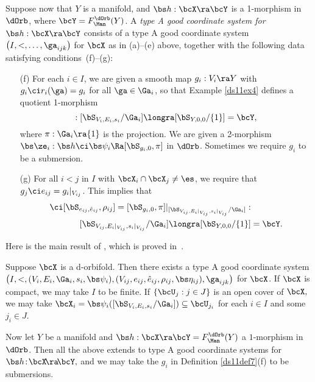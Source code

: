 \documentclass{article}
\begin{document}
\begin{dfn}
Suppose now that $Y$ is a manifold, and $\bs h:\bcX\ra\bcY$ is a
1-morphism in $\dOrb$, where $\bcY=F_\Man^\dOrb(Y)$. A {\it type A
good coordinate system for\/} $\bs h:\bcX\ra\bcY$ consists of a type
A good coordinate system $\bigl(I,<,\ldots,\ga_{ijk}\bigr)$ for
$\bcX$ as in (a)--(e) above, together with the following data
satisfying conditions~(f)--(g):
\begin{itemize}
\setlength{\itemsep}{0pt}
\setlength{\parsep}{0pt}
\item[(f)] For each $i\in I$, we are given a smooth map
$g_i:V_i\ra Y$ with $g_i\ci r_i(\ga)= g_i$ for all
$\ga\in\Ga_i$, so that Example \ref{ds11ex4} defines a quotient
1-morphism
\begin{equation*}
[\bS_{g_i,0},\pi]:[\bS_{V_i, E_i,s_i}/\Ga_i] \longra
[\bS_{Y,0,0}/\{1\}]=\bcY,
\end{equation*}
where $\pi:\Ga_i\ra\{1\}$ is the projection. We are given a
2-morphism $\bs\ze_i:\bs h\ci\bs\psi_i\Ra[\bS_{g_i,0},\pi]$ in
$\dOrb$. Sometimes we require $g_i$ to be a submersion.
\item[(g)] For all $i<j$ in $I$ with $\bcX_i\cap\bcX_j \ne\es$,
we require that $g_j\ci e_{ij}= g_i\vert_{V_{ij}}$. This implies
that
\begin{align*}
[\bS_{g_j,0},\pi]\ci [\bS_{\smash{e_{ij},\hat
e_{ij}}},\rho_{ij}]=[\bS_{g_i,0},\pi]\vert_{[\bS_{V_{ij},
E_i\vert_{V_{ij}},s_i\vert_{V_{ij}}}/\Ga_i]}:&\\
[\bS_{V_{ij},E_i\vert_{V_{ij}},s_i \vert_{V_{ij}}}/\Ga_i]
\longra [\bS_{Y,0,0}/\{1\}]&=\bcY.
\end{align*}
\end{itemize}
\label{ds11def7}
\end{dfn}

Here is the main result of \cite[\S 10.8]{Joyc6}, which is proved
in~\cite[App.~D]{Joyc6}.

\begin{thm} Suppose $\bcX$ is a d-orbifold. Then there exists a
type A good coordinate system
$\bigl(I,<,(V_i,E_i,\Ga_i,s_i,\bs\psi_i),(V_{ij},e_{ij},\hat
e_{ij},\rho_{ij},\bs\eta_{ij}), \ga_{ijk}\bigr)$ for $\bcX$. If\/
$\bcX$ is compact, we may take $I$ to be finite. If\/ $\{\bcU_j:j\in
J\}$ is an open cover of\/ $\bcX,$ we may take
$\bcX_i=\bs\psi_i([\bS_{V_i,E_i,s_i}/\Ga_i]) \subseteq
\bcU_{\smash{j_i}}$ for each\/ $i\in I$ and some\/~$j_i\in J$.

Now let\/ $Y$ be a manifold and\/ $\bs h:\bcX\ra\bcY=
F_\Man^\dOrb(Y)$ a $1$-morphism in $\dOrb$. Then all the above
extends to type A good coordinate systems for $\bs
h\!:\!\bcX\!\ra\!\bcY,$ and we may take the $g_i$ in Definition\/
{\rm\ref{ds11def7}(f)} to be submersions.
\label{ds11thm11}
\end{thm}
\end{document}
